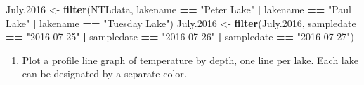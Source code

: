 \documentclass[]{article}
\newenvironment{Shaded}{\begin{snugshade}}{\end{snugshade}}
\newcommand{\FloatTok}[1]{\textcolor[rgb]{0.00,0.00,0.81}{#1}}
\newcommand{\KeywordTok}[1]{\textcolor[rgb]{0.13,0.29,0.53}{\textbf{#1}}}
\newcommand{\NormalTok}[1]{#1}
\newcommand{\OperatorTok}[1]{\textcolor[rgb]{0.81,0.36,0.00}{\textbf{#1}}}
\newcommand{\StringTok}[1]{\textcolor[rgb]{0.31,0.60,0.02}{#1}}
\providecommand{\tightlist}{%
  \setlength{\itemsep}{0pt}\setlength{\parskip}{0pt}}
\begin{document}
\begin{Shaded}
\begin{Highlighting}[]
\NormalTok{July}\FloatTok{.2016}\NormalTok{ <-}\StringTok{ }\KeywordTok{filter}\NormalTok{(NTLdata, lakename }\OperatorTok{==}\StringTok{ "Peter Lake"} \OperatorTok{|}
\StringTok{                      }\NormalTok{lakename }\OperatorTok{==}\StringTok{ "Paul Lake"} \OperatorTok{|}
\StringTok{                      }\NormalTok{lakename }\OperatorTok{==}\StringTok{ "Tuesday Lake"}\NormalTok{)}
\NormalTok{July}\FloatTok{.2016}\NormalTok{ <-}\StringTok{ }\KeywordTok{filter}\NormalTok{(July}\FloatTok{.2016}\NormalTok{, sampledate }\OperatorTok{==}\StringTok{ "2016-07-25"} \OperatorTok{|}
\StringTok{                      }\NormalTok{sampledate }\OperatorTok{==}\StringTok{ "2016-07-26"} \OperatorTok{|}
\StringTok{                      }\NormalTok{sampledate }\OperatorTok{==}\StringTok{ "2016-07-27"}\NormalTok{)}
\end{Highlighting}
\end{Shaded}

\begin{enumerate}
\def\labelenumi{\arabic{enumi}.}
\setcounter{enumi}{8}
\tightlist
\item
  Plot a profile line graph of temperature by depth, one line per lake.
  Each lake can be designated by a separate color.
\end{enumerate}
\end{document}
